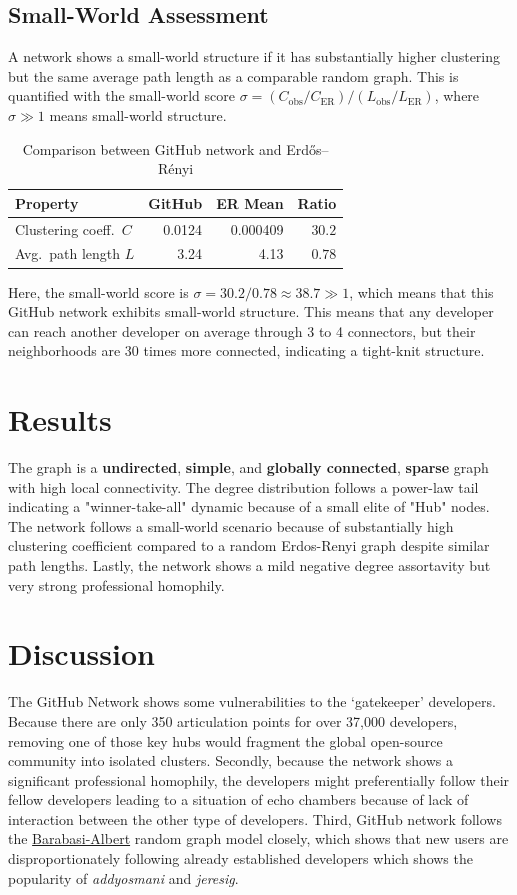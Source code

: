 \documentclass[letterpaper]{article}
\begin{document}
\subsection{Small-World Assessment}
A network shows a small-world structure \cite{watts1998smallworld} if it has substantially higher clustering but the same average path length as a comparable random graph. This is quantified with the small-world score $\sigma = (C_{\text{obs}}/C_{\text{ER}}) / (L_{\text{obs}}/L_{\text{ER}})$, where $\sigma \gg 1$ means small-world structure.

\begin{table}[H]
  \centering
  \begin{tabular}{l|rrr}
    \hline
    \textbf{Property} & \textbf{GitHub} & \textbf{ER Mean} & \textbf{Ratio} \\
    \hline
    Clustering coeff.\ $C$ & 0.0124 & 0.000409 & $30.2$ \\
    Avg.\ path length $L$ & 3.24 & 4.13 & $0.78$ \\
    \hline
  \end{tabular}
  \caption{Comparison between GitHub network and Erd\H{o}s--R{\'e}nyi}
  \label{tab:smallworld}
\end{table}

Here, the small-world score is $\sigma = 30.2 / 0.78 \approx 38.7 \gg 1$, which means that this GitHub network exhibits small-world structure. This means that any developer can reach another developer on average through 3 to 4 connectors, but their neighborhoods are 30 times more connected, indicating a tight-knit structure.

\section{Results}
The graph is a \textbf{undirected}, \textbf{simple}, and \textbf{globally connected}, \textbf{sparse} graph with high local connectivity. The degree distribution follows a power-law tail indicating a "winner-take-all" dynamic because of a small elite of "Hub" nodes. The network follows a small-world scenario because of substantially high clustering coefficient compared to a random Erdos-Renyi graph despite similar path lengths. Lastly, the network shows a mild negative degree assortavity but very strong professional homophily.

\section{Discussion}
The GitHub Network shows some vulnerabilities to the `gatekeeper' developers. Because there are only 350 articulation points for over 37,000 developers, removing one of those key hubs would fragment the global open-source community into isolated clusters. Secondly, because the network shows a significant professional homophily, the developers might preferentially follow their fellow developers leading to a situation of echo chambers because of lack of interaction between the other type of developers. Third, GitHub network follows the \underline{Barabasi-Albert} random graph model closely, which shows that new users are disproportionately following already established developers which shows the popularity of \textit{addyosmani} and \textit{jeresig}.
\end{document}
